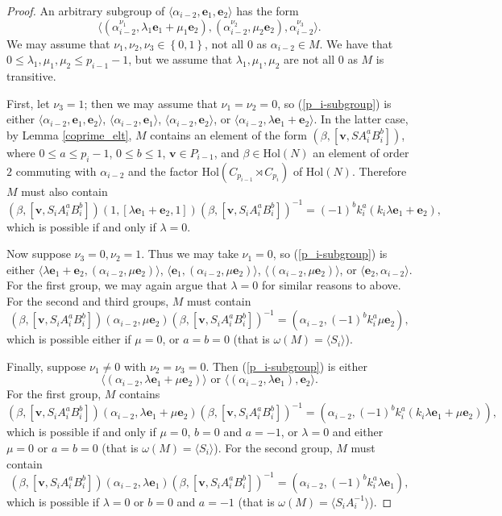 \documentclass[a4paper,reqno]{amsart}
\theoremstyle{definition}
\newcommand{\e}{\textbf{e}}
\newcommand{\Hol}{\mathrm{Hol}}
\begin{document}
\begin{proof}
    An arbitrary subgroup of $\langle \alpha_{i-2},\e_1,\e_2 \rangle$ has the form
    \begin{equation}\label{p_i-subgroup}
        \langle (\alpha_{i-2}^{\nu_1},\lambda_1\e_1+\mu_1\e_2),(\alpha_{i-2}^{\nu_2},\mu_2\e_2),\alpha_{i-2}^{\nu_3} \rangle.
    \end{equation}
    We may assume that $\nu_1,\nu_2,\nu_3 \in \left\{0,1\right\}$, not all $0$ as $\alpha_{i-2} \in M$. We have that $0 \leq \lambda_1,\mu_1,\mu_2 \leq p_{i-1}-1$, but we assume that $\lambda_1,\mu_1,\mu_2$ are not all $0$ as $M$ is transitive.
	
    First, let $\nu_3=1$; then we may assume that $\nu_1=\nu_2=0$, so (\ref{p_i-subgroup}) is either $\langle \alpha_{i-2},\e_1,\e_2 \rangle$, $\langle \alpha_{i-2},\e_1 \rangle$, $\langle \alpha_{i-2},\e_2 \rangle$, or $\langle \alpha_{i-2},\lambda\e_1+\e_2 \rangle$. In the latter case, by Lemma \ref{coprime_elt}, $M$ contains an element of the form $(\beta,[\mathbf{v},SA_i^aB_i^b])$, where $0 \leq a \leq p_i-1$, $0 \leq b \leq 1$, $\mathbf{v} \in P_{i-1}$, and $\beta \in \Hol(N)$ an element of order $2$ commuting with $\alpha_{i-2}$ and the factor $\Hol(C_{p_{i-1}} \rtimes C_{p_i})$ of $\Hol(N)$. Therefore $M$ must also contain
    \[(\beta,[\mathbf{v},S_iA_i^aB_i^b])(1,[\lambda\e_1+\e_2,1])(\beta,[\mathbf{v},S_iA_i^aB_i^b])^{-1}=(-1)^bk_i^a(k_i\lambda\e_1+\e_2),\]
    which is possible if and only if $\lambda=0$.
	
    Now suppose $\nu_3=0, \nu_2=1$. Thus we may take $\nu_1=0$, so (\ref{p_i-subgroup}) is either $\langle\lambda\e_1+\e_2,(\alpha_{i-2},\mu\e_2)\rangle$, $\langle\e_1,(\alpha_{i-2},\mu\e_2)\rangle$, $\langle(\alpha_{i-2},\mu\e_2)\rangle$, or $\langle\e_2,\alpha_{i-2}\rangle$. For the first group, we may again argue that $\lambda=0$ for similar reasons to above. For the second and third groups, $M$ must contain
    \[(\beta,[\mathbf{v},S_iA_i^aB_i^b])(\alpha_{i-2},\mu\e_2)(\beta,[\mathbf{v},S_iA_i^aB_i^b])^{-1}=(\alpha_{i-2},(-1)^bk_i^a\mu\e_2),\]
    which is possible either if $\mu=0$, or $a=b=0$ (that is $\omega(M)=\langle S_i \rangle$).
	
    Finally, suppose $\nu_1\neq 0$ with $\nu_2=\nu_3=0$. Then (\ref{p_i-subgroup}) is either
    \[\langle (\alpha_{i-2},\lambda\e_1+\mu\e_2)\rangle  \text{ or } \langle (\alpha_{i-2},\lambda\e_1),\e_2\rangle.\]
    For the first group, $M$ contains
    \[(\beta,[\mathbf{v},S_iA_i^aB_i^b])(\alpha_{i-2},\lambda\e_1+\mu\e_2)(\beta,[\mathbf{v},S_iA_i^aB_i^b])^{-1}=(\alpha_{i-2},(-1)^bk_i^a(k_i\lambda\e_1+\mu\e_2)),\]
    which is possible if and only if $\mu=0$, $b=0$ and $a=-1$, or $\lambda=0$ and either $\mu=0$ or $a=b=0$ (that is $\omega(M)=\langle S_i \rangle$). For the second group, $M$ must contain
    \[(\beta,[\mathbf{v},S_iA_i^aB_i^b])(\alpha_{i-2},\lambda\e_1)(\beta,[\mathbf{v},S_iA_i^aB_i^b])^{-1}=(\alpha_{i-2},(-1)^bk_i^a\lambda\e_1),\]
    which is possible if $\lambda=0$ or $b=0$ and $a=-1$ (that is $\omega(M)=\langle S_iA_i^{-1} \rangle$).
\end{proof}
\end{document}
